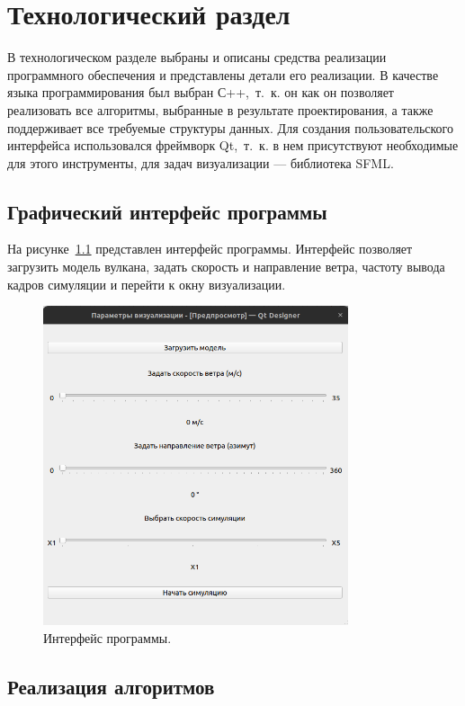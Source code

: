 \chapter{Технологический раздел}

В технологическом разделе выбраны и описаны средства реализации программного обеспечения и представлены детали его реализации.
В качестве языка программирования был выбран С++,~т.~к. он 
как он позволяет реализовать все алгоритмы, выбранные в результате проектирования, а также поддерживает все требуемые структуры данных. Для создания пользовательского интерфейса использовался фреймворк Qt,~т.~к. в нем присутствуют необходимые для этого инструменты, для задач визуализации --- библиотека SFML.

\section{Графический интерфейс программы}
На рисунке~\ref{fig:interface} представлен интерфейс программы. Интерфейс позволяет загрузить модель вулкана, задать скорость и направление ветра, частоту вывода кадров симуляции и перейти к окну визуализации. 

\begin{figure}[H]
	\centering
	\includegraphics[width=0.8\textwidth, page=1]{assets/img/interface.png}   
	\caption{Интерфейс программы.}
	\label{fig:interface}
\end{figure}
\section{Реализация алгоритмов}

